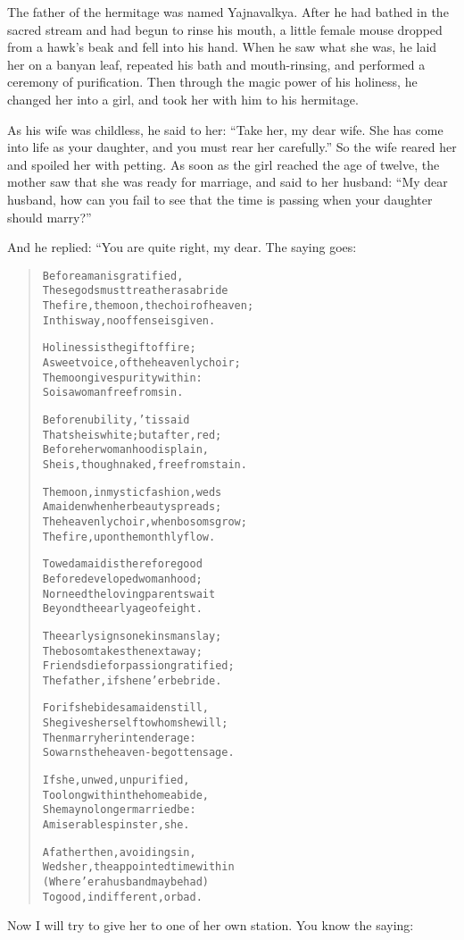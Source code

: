 \documentclass[article, twoside, 14pt]{memoir}
\renewenvironment{verbatim}{%
\begin{quote}%
\vskip -10pt%
\begin{alltt}\normalfont\large}{\end{alltt}%
\end{quote}%
\vskip -10pt
} %
\begin{document}
The father of the hermitage was named Yajnavalkya. After he had
bathed in the sacred stream and had begun to rinse his mouth, a
little female mouse dropped from a hawk's beak and fell into his
hand. When he saw what she was, he laid her on a banyan leaf,
repeated his bath and mouth-rinsing, and performed a ceremony of
purification. Then through the magic power of his holiness, he
changed her into a girl, and took her with him to his hermitage.

As his wife was childless, he said to her:
``Take her, my dear wife. She has come into life as your daughter, and you must rear her carefully.''
So the wife reared her and spoiled her with petting. As soon as the
girl reached the age of twelve, the mother saw that she was ready
for marriage, and said to her husband:
``My dear husband, how can you fail to see that the time is passing when your daughter should marry?''

And he replied: “You are quite right, my dear. The saying goes:

\begin{verbatim}
Before a man is gratified,
These gods must treat her as a bride{\textemdash}
The fire, the moon, the choir of heaven;
In this way, no offense is given.

Holiness is the gift of fire;
A sweet voice, of the heavenly choir;
The moon gives purity within:
So is a woman free from sin.

Before nubility, 'tis said
That she is white; but after, red;
Before her womanhood is plain,
She is, though naked, free from stain.

The moon, in mystic fashion, weds
A maiden when her beauty spreads;
The heavenly choir, when bosoms grow;
The fire, upon the monthly flow.

To wed a maid is therefore good
Before developed womanhood;
Nor need the loving parents wait
Beyond the early age of eight.

The early signs one kinsman slay;
The bosom takes the next away;
Friends die for passion gratified;
The father, if she ne'er be bride.

For if she bides a maiden still,
She gives herself to whom she will;
Then marry her in tender age:
So warns the heaven-begotten sage.

If she, unwed, unpurified,
Too long within the home abide,
She may no longer married be:
A miserable spinster, she.

A father then, avoiding sin,
Weds her, the appointed time within
(Where'er a husband may be had)
To good, indifferent, or bad.
\end{verbatim}
Now I will try to give her to one of her own station. You know the
saying:
\end{document}

